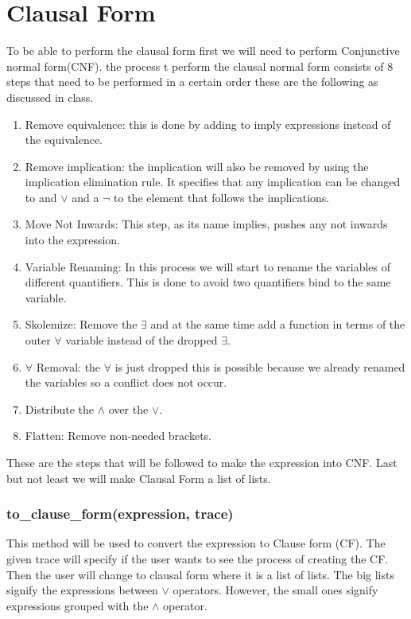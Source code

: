 {\section{Clausal Form}
To be able to perform the clausal form first we will need to perform Conjunctive normal form(CNF). the process t perform the clausal normal form consists of 8 steps that need to be performed in a certain order these are the following as discussed in class.
\begin{enumerate}
\item{Remove equivalence: this is done by adding to imply expressions instead of the equivalence.}
\item{Remove implication: the implication will also be removed by using the implication elimination rule. It specifies that any implication can be changed to and $\vee$ and a $\neg$ to the element that follows the implications.}
\item{Move Not Inwards: This step, as its name implies, pushes any not inwards into the expression.}
\item{Variable Renaming: In this process we will start to rename the variables of different quantifiers. This is done to avoid two quantifiers bind to the same variable.}
\item{Skolemize: Remove the $\exists$ and at the same time add a function in terms of the outer $\forall$ variable instead of the dropped $\exists$.}
\item{$\forall$ Removal: the $\forall$ is just dropped this is possible because we already renamed the variables so a conflict does not occur.}
\item{Distribute the $\wedge$ over the $\vee$.}
\item{Flatten: Remove non-needed brackets.}
\end{enumerate}

These are the steps that will be followed to make the expression into CNF. Last but not least we will make Clausal Form a list of lists.

\subsubsection{to\_clause\_form(expression, trace)}
This method will be used to convert the expression to Clause form (CF). The given trace will specify if the user wants to see the process of creating the CF. Then the user will change to clausal form where it is a list of lists. The big lists signify the expressions between $\vee$ operators. However, the small ones signify expressions grouped with the $\wedge$ operator.

}
